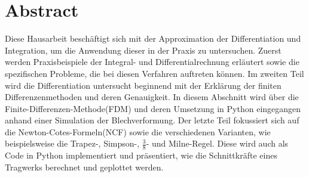 \section*{Abstract}

Diese Hausarbeit beschäftigt sich mit der Approximation der Differentiation und Integration, um die Anwendung dieser in der Praxis zu untersuchen. Zuerst werden Praxisbeispiele der Integral- und Differentialrechnung erläutert sowie die spezifischen Probleme, die bei diesen Verfahren auftreten können. Im zweiten Teil wird die Differentiation untersucht beginnend mit der Erklärung der finiten Differenzenmethoden und deren Genauigkeit. In diesem Abschnitt wird über die Finite-Differenzen-Methode(FDM) und deren Umsetzung in Python eingegangen anhand einer Simulation der Blechverformung. Der letzte Teil fokussiert sich auf die Newton-Cotes-Formeln(NCF) sowie die verschiedenen Varianten, wie beispielsweise die Trapez-, Simpson-, $\frac{3}{8}$- und Milne-Regel. Diese wird auch als Code in Python implementiert und präsentiert, wie die Schnittkräfte eines Tragwerks berechnet und geplottet werden.